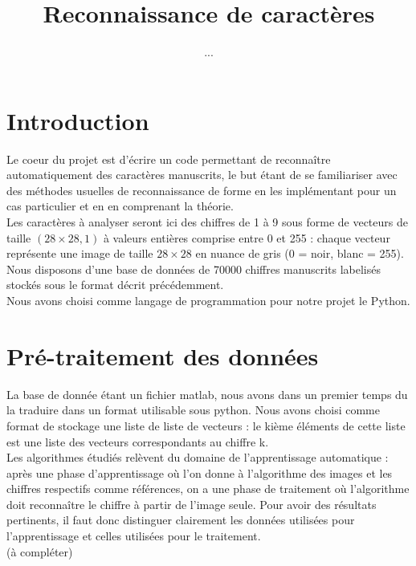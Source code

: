 \documentclass[a4paper,11pt,twoside]{report}
\author{...}
\title{Reconnaissance de caractères}
\begin{document}
 
\maketitle 



\chapter{Introduction}
Le coeur du projet est d'écrire un code permettant de reconnaître automatiquement des caractères manuscrits, le but étant de se familiariser avec des méthodes usuelles de reconnaissance de forme en les implémentant pour un cas particulier et en en comprenant la théorie. \\

Les caractères à analyser seront ici des chiffres de 1 à 9 sous forme de vecteurs de taille $(28\times28,1)$ à valeurs entières comprise entre 0 et 255 : chaque vecteur représente une image de taille $28\times28$ en nuance de gris (0 = noir, blanc = 255). Nous disposons d'une base de données de 70000 chiffres manuscrits labelisés stockés sous le format décrit précédemment.\\
 
Nous avons choisi comme langage de programmation pour notre projet le Python.

\chapter{Pré-traitement des données}
La base de donnée étant un fichier matlab, nous avons dans un premier temps du la traduire dans un format utilisable sous python. Nous avons choisi comme format de stockage une liste de liste de vecteurs : le kième éléments de cette liste est une liste des vecteurs correspondants au chiffre k.\\

Les algorithmes étudiés relèvent du domaine de l'apprentissage automatique : après une phase d'apprentissage où l'on donne à l'algorithme des images et les chiffres respectifs comme références, on a une phase de traitement où l'algorithme doit reconnaître le chiffre à partir de l'image seule. Pour avoir des résultats pertinents, il faut donc distinguer clairement les données utilisées pour l'apprentissage et celles utilisées pour le traitement.\\(à compléter)\\
\end{document}
